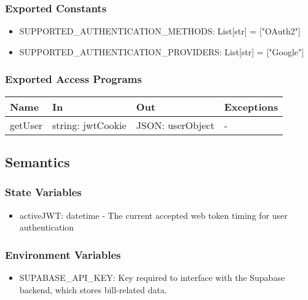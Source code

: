 \documentclass[12pt, titlepage]{article}
\begin{document}
\subsubsection{Exported Constants}

\begin{itemize}
  \item SUPPORTED{\_}AUTHENTICATION{\_}METHODS: List[str] = ["OAuth2"]
  \item SUPPORTED{\_}AUTHENTICATION{\_}PROVIDERS: List[str] = ["Google"]
\end{itemize}

\subsubsection{Exported Access Programs}

\begin{center}
\begin{tabular}{p{2cm} p{4cm} p{5cm} p{3.5cm}}
\hline
\textbf{Name} & \textbf{In} & \textbf{Out} & \textbf{Exceptions} \\
\hline
getUser & string: jwtCookie & JSON: userObject & - \\
\hline
\end{tabular}
\end{center}

\subsection{Semantics}

\subsubsection{State Variables}
\begin{itemize}
  \item activeJWT: datetime - The current accepted web token timing for user authentication
\end{itemize}

\subsubsection{Environment Variables}

\begin{itemize}

    \item SUPABASE{\_}API{\_}KEY: Key required to interface with the Supabase backend, which stores bill-related data.
    
\end{itemize}
\end{document}
